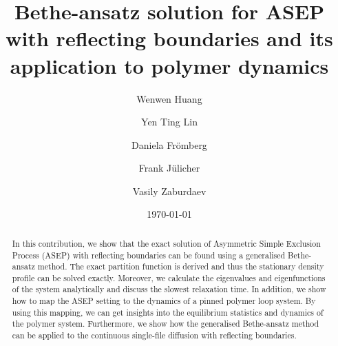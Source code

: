 \documentclass[preprint, aps, superscriptaddress]{revtex4-1}
\begin{document}
\title{Bethe-ansatz solution for ASEP with reflecting boundaries and its application to polymer dynamics}

\author{Wenwen Huang}
\author{Yen Ting Lin}
\author{Daniela Fr\"{o}mberg}
\author{Frank J\"{u}licher}
\author{Vasily Zaburdaev}

\date{\today}

\begin{abstract}

    In this contribution, we show that the exact solution of Asymmetric Simple Exclusion Process (ASEP) with reflecting boundaries can be found using a generalised Bethe-ansatz method. The exact partition function is derived and thus the stationary density profile can be solved exactly. Moreover, we calculate the eigenvalues and eigenfunctions of the system analytically and discuss the slowest relaxation time. In addition, we show how to map the ASEP setting to the dynamics of a pinned polymer loop system. By using this mapping, we can get insights into the equilibrium statistics and dynamics of the polymer system. Furthermore, we show how the generalised Bethe-ansatz method can be applied to the continuous single-file diffusion with reflecting boundaries. 
\end{abstract}
\maketitle
\end{document}
